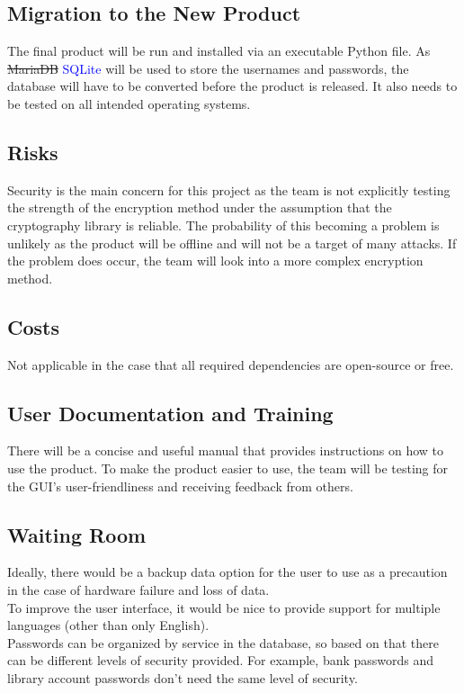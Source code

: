 \documentclass[12pt, titlepage]{article}
\begin{document}
\subsection{Migration to the New Product}

The final product will be run and installed via an executable Python file. As \sout{MariaDB} \textcolor{blue}{SQLite} will be used to store the usernames and passwords, the database will have to be converted before the product is released. It also needs to be tested on all intended operating systems.

\subsection{Risks}

Security is the main concern for this project as the team is not explicitly testing the strength of the encryption method under the assumption that the cryptography library is reliable. The probability of this becoming a problem is unlikely as the product will be offline and will not be a target of many attacks. If the problem does occur, the team will look into a more complex encryption method. 

\subsection{Costs}

Not applicable in the case that all required dependencies are open-source or free.

\subsection{User Documentation and Training}

There will be a concise and useful manual that provides instructions on how to use the product. To make the product easier to use, the team will be testing for the GUI’s user-friendliness and receiving feedback from others. 

\subsection{Waiting Room}

Ideally, there would be a backup data option for the user to use as a precaution in the case of hardware 
failure and loss of data.
\\
To improve the user interface, it would be nice to provide support for multiple languages (other than only English).
\\
Passwords can be organized by service in the database, so based on that there can be different levels of security provided. For example, bank passwords and library account passwords don’t need the same level of security.
\end{document}
